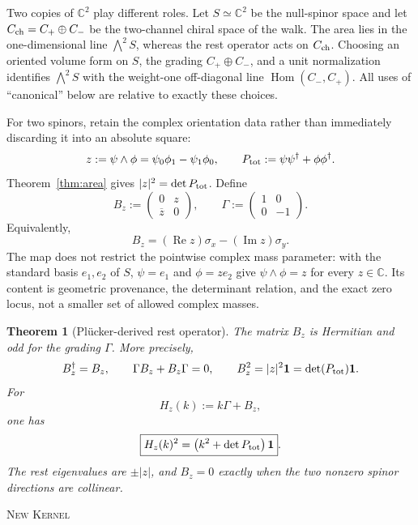 \documentclass[11pt]{article}
\newcommand{\Kernel}{\textcolor{kernelcolor}{\textsc{Kernel}}}
\newcommand{\NewResult}{\textsc{New}}
\newcommand{\C}{\mathbb{C}}
\newcommand{\id}{\mathbf{1}}
\newtheorem{theorem}{Theorem}[section]
\begin{document}
Two copies of $\C^2$ play different roles.  Let
$S\simeq\C^2$ be the null-spinor space and let
$C_{\rm ch}=C_+\oplus C_-$ be the two-channel chiral space of the walk.
The area lies in the one-dimensional line $\bigwedge^2S$, whereas the rest
operator acts on $C_{\rm ch}$.  Choosing an oriented volume form on $S$, the
grading $C_+\oplus C_-$, and a unit normalization identifies
$\bigwedge^2S$ with the weight-one off-diagonal line
$\operatorname{Hom}(C_-,C_+)$.  All uses of ``canonical'' below are relative
to exactly these choices.

For two spinors, retain the complex orientation data rather than immediately
discarding it into an absolute square:
\begin{equation}
 z:=\psi\wedge\phi=\psi_0\phi_1-\psi_1\phi_0,
 \qquad
 P_{\rm tot}:=\psi\psi^\dagger+\phi\phi^\dagger.
\end{equation}
Theorem~\ref{thm:area} gives $|z|^2=\det P_{\rm tot}$.  Define
\begin{equation}\label{eq:Bz}
 B_z:=\begin{pmatrix}0&z\\ \overline z&0\end{pmatrix},
 \qquad
 \Gamma:=\begin{pmatrix}1&0\\0&-1\end{pmatrix}.
\end{equation}
Equivalently,
\begin{equation}\label{eq:BzPauli}
 B_z=(\operatorname{Re}z)\sigma_x-(\operatorname{Im}z)\sigma_y.
\end{equation}
The map does not restrict the pointwise complex mass parameter: with the
standard basis $e_1,e_2$ of $S$, $\psi=e_1$ and $\phi=z e_2$ give
$\psi\wedge\phi=z$ for every $z\in\C$.  Its content is geometric provenance,
the determinant relation, and the exact zero locus, not a smaller set of
allowed complex masses.

\begin{theorem}[Pl\"ucker-derived rest operator]\label{thm:Bz}
The matrix $B_z$ is Hermitian and odd for the grading $\Gamma$.  More
precisely,
\begin{equation}\label{eq:Bzidentities}
 B_z^\dagger=B_z,
 \qquad
 \Gamma B_z+B_z\Gamma=0,
 \qquad
 B_z^2=|z|^2\id=\det(P_{\rm tot})\id.
\end{equation}
For
\begin{equation}\label{eq:Hz}
 H_z(k):=k\Gamma+B_z,
\end{equation}
one has
\begin{equation}\label{eq:hero}
 \boxed{H_z(k)^2=\left(k^2+\det P_{\rm tot}\right)\id}.
\end{equation}
The rest eigenvalues are $\pm|z|$, and $B_z=0$ exactly when the two nonzero
spinor directions are collinear.
\end{theorem}
\noindent\NewResult{} \Kernel{}
\end{document}
